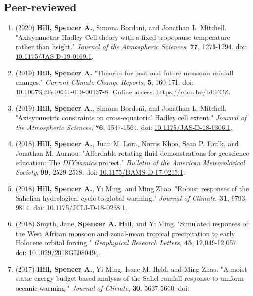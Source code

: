 \documentclass[12pt,letterpaper]{shillcv}
\begin{document}
\subsection*{Peer-reviewed}
\label{sec:org68642a8}
\begin{enumerate}
\item (2020) \textbf{Hill, Spencer A.}, Simona Bordoni, and Jonathan L. Mitchell.
"Axisymmetric Hadley Cell theory with a fixed tropopause temperature rather
than height."  \emph{Journal of the Atmospheric Sciences}, \textbf{77}, 1279-1294.  doi:
\href{https://doi.org/10.1175/JAS-D-19-0169.1}{10.1175/JAS-D-19-0169.1}.
\item (2019) \textbf{Hill, Spencer A.} "Theories for past and future monsoon rainfall
changes."  \emph{Current Climate Change Reports}, \textbf{5}, 160-171.  doi:
\href{https://doi.org/10.1007\%2Fs40641-019-00137-8}{10.1007\%2Fs40641-019-00137-8}.  Online access: \url{https://rdcu.be/bHFCZ}.
\item (2019) \textbf{Hill, Spencer A.}, Simona Bordoni, and Jonathan L. Mitchell.
"Axisymmetric constraints on cross-equatorial Hadley cell extent."
\emph{Journal of the Atmospheric Sciences}, \textbf{76}, 1547-1564.  doi: \href{https://doi.org/10.1175/JAS-D-18-0306.1}{10.1175/JAS-D-18-0306.1}.
\item (2018) \textbf{Hill, Spencer A.}, Juan M. Lora, Norris Khoo, Sean P. Faulk, and
Jonathan M.  Aurnou.  "Affordable rotating fluid demonstrations for
geoscience education: The \emph{DIYnamics} project."  \emph{Bulletin of the
American Meteorological Society}, \textbf{99}, 2529-2538.  doi:
\href{https://doi.org/10.1175/BAMS-D-17-0215.1}{10.1175/BAMS-D-17-0215.1}.
\item (2018) \textbf{Hill, Spencer A.}, Yi Ming, and Ming Zhao.  "Robust responses of the
Sahelian hydrological cycle to global warming."  \emph{Journal of
Climate}, \textbf{31}, 9793-9814.  doi: \href{https://doi.org/10.1175/JCLI-D-18-0238.1}{10.1175/JCLI-D-18-0238.1}.
\item (2018) Smyth, Jane, \textbf{Spencer A. Hill}, and Yi Ming.  "Simulated responses of
the West African monsoon and zonal-mean tropical precipitation to early
Holocene orbital forcing."  \emph{Geophysical Research Letters}, \textbf{45},
12,049-12,057.  doi: \href{https://doi.org/10.1029/2018GL080494}{10.1029/2018GL080494}.
\item (2017) \textbf{Hill, Spencer A.}, Yi Ming, Isaac M. Held, and Ming Zhao.  "A moist
static energy budget-based analysis of the Sahel rainfall response to uniform
oceanic warming."  \emph{Journal of Climate}, \textbf{30}, 5637-5660.  doi:

\end{enumerate}
\end{document}
